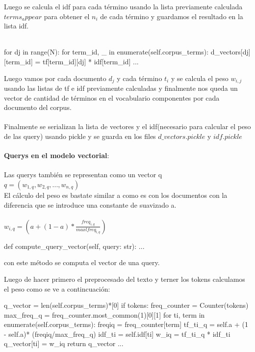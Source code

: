 \documentclass{llncs}
\begin{document}
Luego se calcula el idf para cada término usando la lista previamente calculada $terms_appear$ para obtener 
el $n_i$ de cada término y guardamos el resultado en la lista idf.
\\\\
\begin{python}
    for dj in range(N):
            for term_id, _ in enumerate(self.corpus_terms):
                d_vectors[dj][term_id] = tf[term_id][dj] * idf[term_id]
    ...
\end{python}
\noindent
Luego vamos por cada documento $d_j$ y cada término $t_i$ y se calcula el peso $w_{i,j}$ 
usando las listas de tf e idf previamente calculadas y finalmente nos queda un vector 
de cantidad de términos en el vocabulario componentes por cada documento del corpus. 
\\\\
Finalmente se serializan la lista de vectores y el idf(necesario para calcular el peso de las query)
usando pickle y se guarda en los files $d\_vectors.pickle$ y $idf.pickle$
\\\\
\noindent
\textbf{Querys en el modelo vectorial}:\\\\
Las querys también se representan como un vector q\\
\noindent
$
    q =(w_{1,q}, w_{2,q},...,w_{n,q})
$
\noindent
\\
El cálculo del peso es bastate similar a como es con los documentos 
con la diferencia que se introduce una constante de suavizado a.
\\\\
$
    w_{i,q} = (a+(1-a)*\frac{freq_{i,q}}{maxlfreq_{l,q}})
$

\begin{python}
    def compute_query_vector(self, query: str):
    ...
\end{python}

con este método se computa el vector de una query.

Luego de hacer primero el preprocesado del texto y terner los tokens
calculamos el peso como se ve a contincuación:
\begin{python}
    q_vector = len(self.corpus_terms)*[0]
    if tokens:
        freq_counter = Counter(tokens)
        max_freq_q  = freq_counter.most_common(1)[0][1] 
        for ti, term in enumerate(self.corpus_terms):
            freqiq = freq_counter[term] 
            tf_ti_q = self.a + (1 - self.a)* (freqiq/max_freq_q) 
            idf_ti = self.idf[ti] 
            w_iq = tf_ti_q * idf_ti 
            q_vector[ti] = w_iq
    return q_vector
    ...
\end{python}
\end{document}
